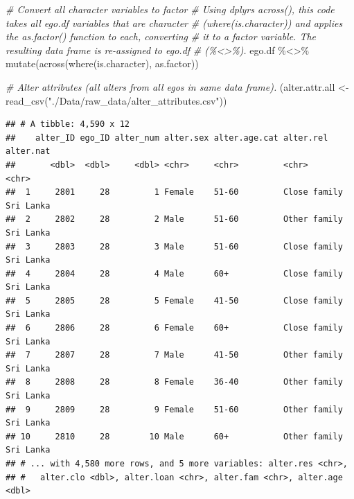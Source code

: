 \documentclass[
]{book}
\newenvironment{Shaded}{\begin{snugshade}}{\end{snugshade}}
\newcommand{\CommentTok}[1]{\textcolor[rgb]{0.56,0.35,0.01}{\textit{#1}}}
\newcommand{\FunctionTok}[1]{\textcolor[rgb]{0.00,0.00,0.00}{#1}}
\newcommand{\NormalTok}[1]{#1}
\newcommand{\OtherTok}[1]{\textcolor[rgb]{0.56,0.35,0.01}{#1}}
\newcommand{\SpecialCharTok}[1]{\textcolor[rgb]{0.00,0.00,0.00}{#1}}
\newcommand{\StringTok}[1]{\textcolor[rgb]{0.31,0.60,0.02}{#1}}
\begin{document}
\begin{Shaded}
\begin{Highlighting}[]
\CommentTok{\# Convert all character variables to factor}
\CommentTok{\# Using dplyr\textquotesingle{}s across(), this code takes all ego.df variables that are character}
\CommentTok{\# (where(is.character)) and applies the as.factor() function to each, converting }
\CommentTok{\# it to a factor variable. The resulting data frame is re{-}assigned to ego.df }
\CommentTok{\# (\%\textless{}\textgreater{}\%).}
\NormalTok{ego.df }\SpecialCharTok{\%\textless{}\textgreater{}\%} 
  \FunctionTok{mutate}\NormalTok{(}\FunctionTok{across}\NormalTok{(}\FunctionTok{where}\NormalTok{(is.character), as.factor))}

\CommentTok{\# Alter attributes (all alters from all egos in same data frame).}
\NormalTok{(alter.attr.all }\OtherTok{\textless{}{-}} \FunctionTok{read\_csv}\NormalTok{(}\StringTok{"./Data/raw\_data/alter\_attributes.csv"}\NormalTok{))}
\end{Highlighting}
\end{Shaded}

\begin{verbatim}
## # A tibble: 4,590 x 12
##    alter_ID ego_ID alter_num alter.sex alter.age.cat alter.rel    alter.nat
##       <dbl>  <dbl>     <dbl> <chr>     <chr>         <chr>        <chr>    
##  1     2801     28         1 Female    51-60         Close family Sri Lanka
##  2     2802     28         2 Male      51-60         Other family Sri Lanka
##  3     2803     28         3 Male      51-60         Close family Sri Lanka
##  4     2804     28         4 Male      60+           Close family Sri Lanka
##  5     2805     28         5 Female    41-50         Close family Sri Lanka
##  6     2806     28         6 Female    60+           Close family Sri Lanka
##  7     2807     28         7 Male      41-50         Other family Sri Lanka
##  8     2808     28         8 Female    36-40         Other family Sri Lanka
##  9     2809     28         9 Female    51-60         Other family Sri Lanka
## 10     2810     28        10 Male      60+           Other family Sri Lanka
## # ... with 4,580 more rows, and 5 more variables: alter.res <chr>,
## #   alter.clo <dbl>, alter.loan <chr>, alter.fam <chr>, alter.age <dbl>
\end{verbatim}
\end{document}
